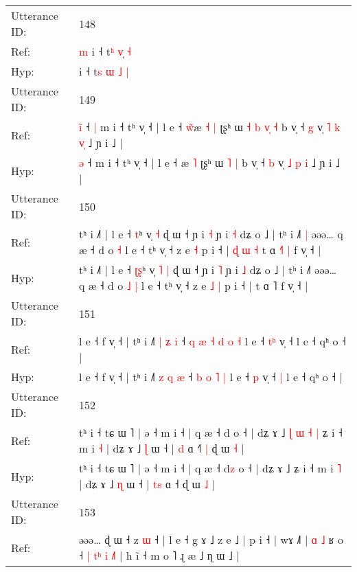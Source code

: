\documentclass[10pt]{article}
\DeclareRobustCommand{\hl}[1]{{\textcolor{red}{#1}}}
\begin{document}
\begin{longtable}{ll}
\midrule
Utterance ID: & 148 \\
Ref: & \hl{m}\hl{ }i ˧ t\hl{ʰ} \hl{}\hl{v}\hl{̩} \hl{˧}
 \\
Hyp: & \hl{}\hl{}i ˧ t\hl{s} \hl{ɯ}\hl{ }\hl{˩} \hl{|}
 \\
\midrule
Utterance ID: & 149 \\
Ref: & \hl{i}\hl{̃} ˧\hl{ }\hl{|} m i ˧ tʰ v̩ ˧ | l e ˧ \hl{w}\hl{̃}æ\hl{ }\hl{˧} \hl{|} ʈʂʰ ɯ\hl{ }\hl{˧}\hl{ }\hl{b} \hl{v}\hl{̩} \hl{˧} b v̩ ˧ \hl{g} v̩ \hl{˥} \hl{k} \hl{v}\hl{̩} ˩ ɲ i ˩ |
 \\
Hyp: & \hl{}\hl{ə} ˧\hl{}\hl{} m i ˧ tʰ v̩ ˧ | l e ˧ \hl{}\hl{}æ\hl{}\hl{} \hl{˥} ʈʂʰ ɯ\hl{}\hl{}\hl{}\hl{} \hl{}\hl{˥} \hl{|} b v̩ ˧ \hl{b} v̩ \hl{˩} \hl{p} \hl{}\hl{i} ˩ ɲ i ˩ |
 \\
\midrule
Utterance ID: & 150 \\
Ref: & tʰ i ˩˥ | l e ˧ \hl{}\hl{t}ʰ v̩\hl{}\hl{} \hl{˧} ɖ ɯ ˧ ɲ i \hl{˧} ɲ i \hl{˧} dʑ o ˩ | tʰ i ˩˥\hl{ }\hl{|} əəə… q æ ˧ d o\hl{}\hl{} \hl{˧} l e ˧ tʰ v̩ ˧ z e\hl{}\hl{} \hl{˧} p i ˧ |\hl{ }\hl{ɖ}\hl{ }\hl{ɯ}\hl{ }\hl{˧} t ɑ \hl{˧}˥\hl{ }\hl{|} f v̩ ˧ |
 \\
Hyp: & tʰ i ˩˥ | l e ˧ \hl{ʈ}\hl{ʂ}ʰ v̩\hl{ }\hl{˥} \hl{|} ɖ ɯ ˧ ɲ i \hl{˥} ɲ i \hl{˩} dʑ o ˩ | tʰ i ˩˥\hl{}\hl{} əəə… q æ ˧ d o\hl{ }\hl{˩} \hl{|} l e ˧ tʰ v̩ ˧ z e\hl{ }\hl{˩} \hl{|} p i ˧ |\hl{}\hl{}\hl{}\hl{}\hl{}\hl{} t ɑ \hl{}˥\hl{}\hl{} f v̩ ˧ |
 \\
\midrule
Utterance ID: & 151 \\
Ref: & l e ˧ f v̩ ˧ | tʰ i ˩˥ \hl{|} \hl{ʑ} \hl{i} ˧\hl{ }\hl{q}\hl{ }\hl{æ} \hl{˧} \hl{d} \hl{o} \hl{˧} l e ˧ \hl{t}\hl{ʰ} v̩ ˧\hl{}\hl{} l e ˧ qʰ o ˧ |
 \\
Hyp: & l e ˧ f v̩ ˧ | tʰ i ˩˥ \hl{z} \hl{q} \hl{æ} ˧\hl{}\hl{}\hl{}\hl{} \hl{b} \hl{o} \hl{˥} \hl{|} l e ˧ \hl{}\hl{p} v̩ ˧\hl{ }\hl{|} l e ˧ qʰ o ˧ |
 \\
\midrule
Utterance ID: & 152 \\
Ref: & tʰ i ˧ tɕ ɯ ˥ | ə ˧ m i ˧ | q æ ˧ d\hl{} o ˧ | dʑ ɤ ˩\hl{ }\hl{ɭ}\hl{ }\hl{ɯ}\hl{ }\hl{˧}\hl{ }\hl{|} ʑ i ˧ m i \hl{˧} | dʑ ɤ ˩ \hl{ɭ} ɯ ˧ | \hl{}\hl{d} ɑ ˧\hl{˥}\hl{ }\hl{|} ɖ ɯ \hl{˧} |
 \\
Hyp: & tʰ i ˧ tɕ ɯ ˥ | ə ˧ m i ˧ | q æ ˧ d\hl{z} o ˧ | dʑ ɤ ˩\hl{}\hl{}\hl{}\hl{}\hl{}\hl{}\hl{}\hl{} ʑ i ˧ m i \hl{˥} | dʑ ɤ ˩ \hl{ɳ} ɯ ˧ | \hl{t}\hl{s} ɑ ˧\hl{}\hl{}\hl{} ɖ ɯ \hl{˩} |
 \\
\midrule
Utterance ID: & 153 \\
Ref: & əəə… ɖ ɯ ˧ z \hl{ɯ} ˧\hl{}\hl{}\hl{}\hl{}\hl{}\hl{}\hl{} | l e ˧ g ɤ ˩ z e ˩ | p i ˧ | wɤ ˩˥ | \hl{ɑ} \hl{˩} ʁ o ˧\hl{ }\hl{|}\hl{ }\hl{t}\hl{ʰ}\hl{ }\hl{i}\hl{ }\hl{˩}\hl{˥} | h ĩ ˧ m o ˥ ɻ æ ˩ ɳ ɯ ˩ |

\end{longtable}
\end{document}
